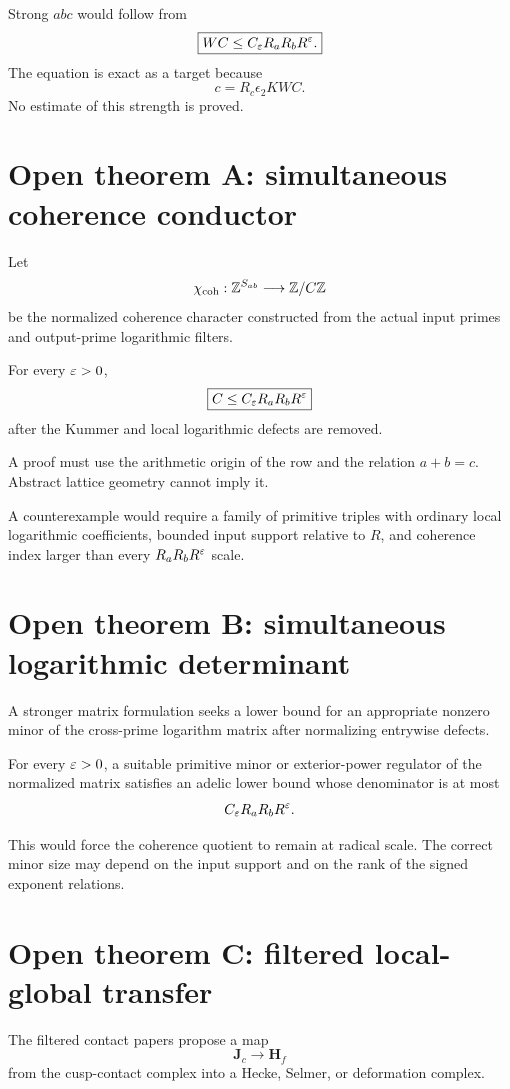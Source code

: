 Strong $abc$ would follow from
\[
\boxed{
WC
\le
C_\varepsilon R_aR_bR^\varepsilon.
}
\]
The equation is exact as a target because
\[
c=R_c\epsilon_2KWC.
\]
No estimate of this strength is proved.

\section{Open theorem A: simultaneous coherence conductor}
Let
\[
\chi_{\mathrm{coh}}:\mathbb Z^{S_{ab}}\longrightarrow\mathbb Z/C\mathbb Z
\]
be the normalized coherence character constructed from the actual input primes and output-prime logarithmic filters.

\begin{conjecture}
For every $\varepsilon>0$,
\[
\boxed{
C
\le
C_\varepsilon R_aR_bR^\varepsilon
}
\]
after the Kummer and local logarithmic defects are removed.
\end{conjecture}

A proof must use the arithmetic origin of the row and the relation $a+b=c$. Abstract lattice geometry cannot imply it.

A counterexample would require a family of primitive triples with ordinary local logarithmic coefficients, bounded input support relative to $R$, and coherence index larger than every $R_aR_bR^\varepsilon$ scale.

\section{Open theorem B: simultaneous logarithmic determinant}
A stronger matrix formulation seeks a lower bound for an appropriate nonzero minor of the cross-prime logarithm matrix after normalizing entrywise defects.

\begin{conjecture}
For every $\varepsilon>0$, a suitable primitive minor or exterior-power regulator of the normalized matrix satisfies an adelic lower bound whose denominator is at most
\[
C_\varepsilon R_aR_bR^\varepsilon.
\]
\end{conjecture}

This would force the coherence quotient to remain at radical scale. The correct minor size may depend on the input support and on the rank of the signed exponent relations.

\section{Open theorem C: filtered local-global transfer}
The filtered contact papers propose a map
\[
\mathbf J_c
\longrightarrow
\mathbf H_f
\]
from the cusp-contact complex into a Hecke, Selmer, or deformation complex.

